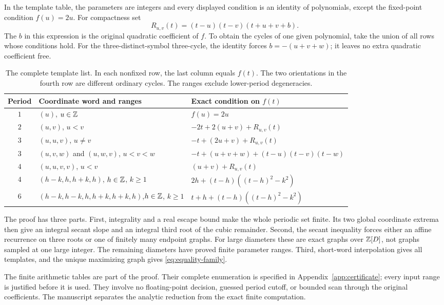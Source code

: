 In the template table, the parameters are integers and every displayed
condition is an identity of polynomials, except the fixed-point
condition $f(u)=2u$. For compactness set
\begin{equation}
 R_{u,v}(t)=(t-u)(t-v)(t+u+v+b).
 \label{eq:Ruv}
\end{equation}
The $b$ in this expression is the original quadratic coefficient of
$f$. To obtain the cycles of one given polynomial, take the union of
all rows whose conditions hold. For the three-distinct-symbol
three-cycle, the identity forces $b=-(u+v+w)$; it leaves no extra
quadratic coefficient free.

\begin{table}[htbp]
\centering\small
\setlength{\tabcolsep}{4pt}
\begin{tabular}{@{}c p{5.2cm} p{9.0cm}@{}}
\toprule
Period & Coordinate word and ranges & Exact condition on $f(t)$\\
\midrule
$1$ & $(u)$, $u\in\mathbb{Z}$ & $f(u)=2u$\\[3pt]
$2$ & $(u,v)$, $u<v$ & $-2t+2(u+v)+R_{u,v}(t)$\\[3pt]
$3$ & $(u,u,v)$, $u\ne v$ & $-t+(2u+v)+R_{u,v}(t)$\\[3pt]
$3$ & $(u,v,w)$ and $(u,w,v)$, $u<v<w$
 & $-t+(u+v+w)+(t-u)(t-v)(t-w)$\\[3pt]
$4$ & $(u,u,v,v)$, $u<v$ & $(u+v)+R_{u,v}(t)$\\[3pt]
$4$ & $(h-k,h,h+k,h)$, $h\in\mathbb{Z}$, $k\ge1$
 & $2h+(t-h)((t-h)^2-k^2)$\\[3pt]
$6$ & $(h-k,h-k,h,h+k,h+k,h)$,\newline $h\in\mathbb{Z}$, $k\ge1$
 & $t+h+(t-h)((t-h)^2-k^2)$\\
\bottomrule
\end{tabular}
\caption{The complete template list. In each nonfixed row, the last
column equals $f(t)$. The two orientations in the fourth row are
different ordinary cycles. The ranges exclude lower-period
degeneracies.}
\label{tab:templates}
\end{table}

The proof has three parts. First, integrality and a real escape bound
make the whole periodic set finite. Its two global coordinate extrema
then give an integral secant slope and an integral third root of the
cubic remainder. Second, the secant inequality forces either an affine
recurrence on three roots or one of finitely many endpoint graphs.
For large diameters these are exact graphs over $\mathbb{Z}[D]$, not graphs
sampled at one large integer. The remaining diameters have proved
finite parameter ranges. Third, short-word interpolation gives all
templates, and the unique maximizing graph gives
\eqref{eq:equality-family}.

The finite arithmetic tables are part of the proof. Their complete
enumeration is specified in Appendix~\ref{app:certificate}; every
input range is justified before it is used. They involve no floating-point
decision, guessed period cutoff, or bounded scan through the
original coefficients. The manuscript separates the analytic
reduction from the exact finite computation.
